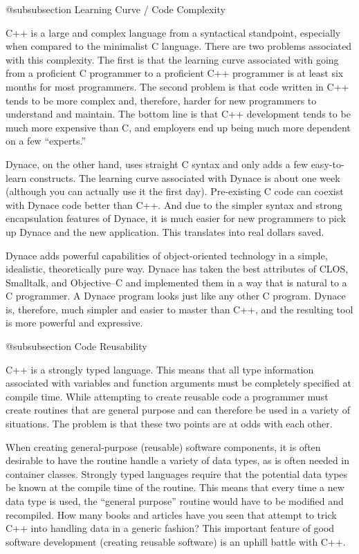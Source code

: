 @subsubsection Learning Curve / Code Complexity

C++ is a large and complex language from a syntactical standpoint,
especially when compared to the minimalist C language.  There are two
problems associated with this complexity.  The first is that the
learning curve associated with going from a proficient C programmer to
a proficient C++ programmer is at least six months for most
programmers.  The second problem is that code written in C++ tends
to be more complex and, therefore, harder for new programmers to
understand and maintain.  The bottom line is that C++ development
tends to be much more expensive than C, and employers end up being
much more dependent on a few ``experts.''

Dynace, on the other hand, uses straight C syntax and only adds a few
easy-to-learn constructs.  The learning curve associated with Dynace
is about one week (although you can actually use it the first day).
Pre-existing C code can coexist with Dynace code better than C++.
And due to the simpler syntax and strong encapsulation features of
Dynace, it is much easier for new programmers to pick up Dynace and
the new application.  This translates into real dollars saved.

Dynace adds powerful capabilities of object-oriented technology in a
simple, idealistic, theoretically pure way.  Dynace has taken the best
attributes of CLOS, Smalltalk, and Objective--C and implemented them in a
way that is natural to a C programmer.  A Dynace program looks just
like any other C program.  Dynace is, therefore, much simpler and easier
to master than C++, and the resulting tool is more powerful and expressive.

@subsubsection Code Reusability

C++ is a strongly typed language.  This means that all type information
associated with variables and function arguments must be completely
specified at compile time.  While attempting to create reusable code
a programmer must create routines that are general purpose and can
therefore be used in a variety of situations.  The problem is that
these two points are at odds with each other.

When creating general-purpose (reusable) software components, it is often
desirable to have the routine handle a variety of data types, as is
often needed in container classes.  Strongly typed languages require
that the potential data types be known at the compile time of the routine.
This means that every time a new data type is used, the ``general purpose''
routine would have to be modified and recompiled.  How many books and
articles have you seen that attempt to trick C++ into handling data
in a generic fashion?  This important feature of good software development
(creating reusable software) is an uphill battle with C++.


